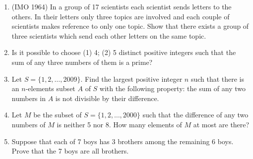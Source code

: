 \documentclass[11pt]{scrartcl}
\begin{document}
\begin{enumerate}
    \item (IMO 1964) In a group of 17 scientists each scientist sends letters to the others. In their letters only three topics are involved and each couple of scientists makes reference to only one topic. Show that there exists a group of three scientists which send each other letters on the same topic. 
    \item Is it possible to choose (1) 4; (2) 5 distinct positive integers such that the sum of any three numbers of them is a prime?
    \item Let $S = \{1, 2, \ldots, 2009\}$. Find the largest positive integer $n$ such that there is an $n$-elements subset $A$ of $S$ with the following property: the sum of any two numbers in $A$ is not divisible by their difference.
    \item Let $M$ be the subset of $S = \{1, 2, \ldots, 2000\}$ such that the difference of any two numbers of $M$ is neither 5 nor 8. How many elements of $M$ at most are there?
    \item Suppose that each of 7 boys has 3 brothers among the remaining 6 boys. Prove that the 7 boys are all brothers. 


\end{enumerate}
\end{document}
